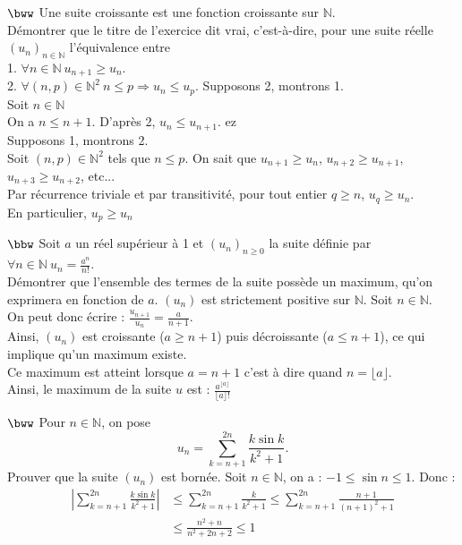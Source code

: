 \documentclass[11pt]{article}
\begin{document}
\begin{exercice}{$\bww$}{}
    Une suite croissante est une fonction croissante sur $\mathbb{N}$.\\
    Démontrer que le titre de l'exercice dit vrai, c'est-à-dire, pour une suite réelle $(u_n)_{n\in\mathbb{N}}$ l'équivalence entre\\
    1. $\forall{n\in\mathbb{N}} ~ u_{n+1} \geq u_n$.\\
    2. $\forall{(n,p)\in\mathbb{N}^2} ~ n \leq p \Longrightarrow u_n \leq u_p$.
    \tcblower
    Supposons 2, montrons 1.\\
    Soit $n\in\mathbb{N}$\\
    On a $n\leq n+1$. D'après 2, $u_n \leq u_{n+1}$. ez\\[0.1cm]
    Supposons 1, montrons 2.\\
    Soit $(n, p)\in\mathbb{N}^2$ tels que $n \leq p$. On sait que $u_{n+1} \geq u_n$, $u_{n+2} \geq u_{n+1}$, $u_{n+3} \geq u_{n+2}$, etc...\\
    Par récurrence triviale et par transitivité, pour tout entier $q\geq n$, $u_q \geq u_n$.\\
    En particulier, $u_p \geq u_n$
\end{exercice}

\begin{exercice}{$\bbw$}{}
    Soit $a$ un réel supérieur à 1 et $(u_n)_{n\geq0}$ la suite définie par $\forall n \in \mathbb{N} ~ u_n = \frac{a^n}{n!}$.\\
    Démontrer que l'ensemble des termes de la suite possède un maximum, qu'on exprimera en fonction de $a$.
    \tcblower
    $(u_n)$ est strictement positive sur $\mathbb{N}$. Soit $n \in \mathbb{N}$.\\
    On peut donc écrire : $\frac{u_{n+1}}{u_n}=\frac{a}{n+1}$.\\
    Ainsi, $(u_n)$ est croissante ($a\geq n+1$) puis décroissante ($a\leq n+1$), ce qui implique qu'un maximum existe.\\
    Ce maximum est atteint lorsque $a=n+1$ c'est à dire quand $n=\lfloor a \rfloor$.\\
    Ainsi, le maximum de la suite $u$ est : $\frac{a^{\lfloor a \rfloor}}{\lfloor a \rfloor!}$
\end{exercice}

\begin{exercice}{$\bww$}{}
    Pour $n\in\mathbb{N}$, on pose
    \begin{equation*}
        u_n = \sum_{k=n+1}^{2n}\frac{k\sin k}{k^2+1}.
    \end{equation*}
    Prouver que la suite $(u_n)$ est bornée.
    \tcblower
    Soit $n\in\mathbb{N}$, on a : $-1 \leq \sin n \leq 1$. Donc :
    \begin{align*}
        \left|\sum_{k=n+1}^{2n}\frac{k\sin k}{k^2+1}\right| &\leq \sum_{k=n+1}^{2n}\frac{k}{k^2+1}
        \leq \sum_{k=n+1}^{2n}\frac{n+1}{(n+1)^2+1}\\
        &\leq \frac{n^2 + n}{n^2 + 2n + 2}\leq 1
    \end{align*}
\end{exercice}
\end{document}
